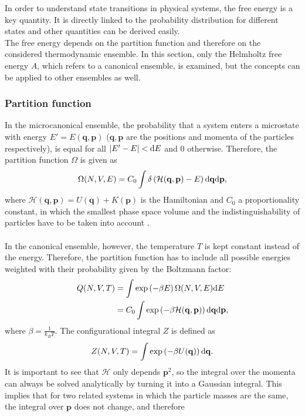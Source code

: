 In order to understand state transitions in physical systems, the free energy is a key quantity. It is directly linked to the probability distribution for different states and other quantities can be derived easily.\\
The free energy depends on the partition function and therefore on the considered thermodynamic ensemble. In this section, only the Helmholtz free energy $A$, which refers to a canonical ensemble, is examined, but the concepts can be applied to other ensembles as well.
\subsubsection{Partition function}
In the microcanonical ensemble, the probability that a system enters a microstate with energy $E' = E(\mathbf{q}, \mathbf{p})$ ($\mathbf{q}, \mathbf{p}$ are the positions and momenta of the particles respectively), is equal for all $\left|E' - E\right| < \text{d} E$ and $0$ otherwise. Therefore, the partition function $\Omega$ is given as
\begin{equation}
\label{eq:partfunc}
\Omega(N, V, E) = C_0 \int \delta\left(\mathcal{H}(\mathbf{q}, \mathbf{p}) - E\right) \text{d} \mathbf{q} \text{d} \mathbf{p},
\end{equation}
where $\mathcal{H}(\mathbf{q}, \mathbf{p}) = U(\mathbf{q}) + K(\mathbf{p})$ is the Hamiltonian and $C_0$ a proportionality constant, in which the smallest phase space volume and the indistinguishability of particles have to be taken into account \autocite[16]{freeEnergyBook}.\\
\\
In the canonical ensemble, however, the temperature $T$ is kept constant instead of the energy. Therefore, the partition function has to include all possible energies weighted with their probability given by the Boltzmann factor:
\begin{align}
Q(N, V, T) &= \int \exp\left(-\beta E\right) \Omega(N, V, E) \text{d} E\\
&= C_0 \int \exp\left(-{\beta\mathcal{H}(\mathbf{q}, \mathbf{p})}\right) \text{d} \mathbf{q} \text{d} \mathbf{p},
\end{align}
where $\beta = \frac{1}{k_B T}$.
The configurational integral $Z$ is defined as 
\begin{equation}
Z(N, V, T) = \int \exp\left(-{\beta U}(\mathbf{q})\right) \text{d} \mathbf{q}.
\end{equation}
It is important to see that $\mathcal{H}$ only depends $\mathbf{p}^2$, so the integral over the momenta can always be solved analytically by turning it into a Gaussian integral. This implies that for two related systems in which the particle masses are the same, the integral over $\mathbf{p}$ does not change, and therefore
